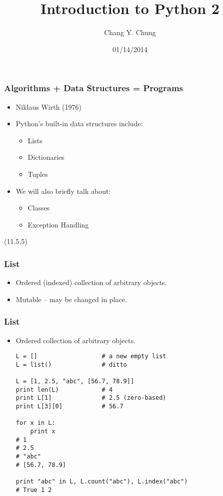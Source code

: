\documentclass{beamer}
\begin{document}
\title{Introduction to Python 2}
\date{01/14/2014}
\author{Chang Y. Chung}

{
\begin{frame}[noframenumbering]
\titlepage
\end{frame}}

\begin{frame}[fragile]
\frametitle{Algorithms + Data Structures = Programs}
\begin{itemize}
\item<1-> Niklaus Wirth (1976)\cite{Wirth1976}
\item<2-> Python's built-in data structures include:
\begin{itemize}
  \item Lists
  \item Dictionaries
  \item Tuples
\end{itemize}
\item<3-> We will also briefly talk about:
\begin{itemize}
  \item Classes
  \item Exception Handling
\end{itemize}
\end{itemize}

\begin{textblock}{5}(11.5,5)
\end{textblock}
\end{frame}

\begin{frame}[fragile]
\frametitle{List}
\begin{itemize}
\item Ordered (indexed) collection of arbitrary objects.
\item Mutable -- may be changed in place.
\end{itemize}
\end{frame}

\begin{frame}[fragile]
\frametitle{List}
\begin{itemize}
\item Ordered collection of arbitrary objects.
\begin{lstlisting}[escapechar=\%]
L = []                  # a new empty list
L = list()              # ditto

L = [1, 2.5, "abc", [56.7, 78.9]]
print len(L)            # 4
print L[1]              # 2.5 (zero-based)
print L[3][0]           # 56.7

for x in L:
    print x
# 1
# 2.5
# "abc"
# [56.7, 78.9]

print "abc" in L, L.count("abc"), L.index("abc")
# True 1 2
\end{lstlisting}
\end{itemize}
\end{frame}
\end{document}
